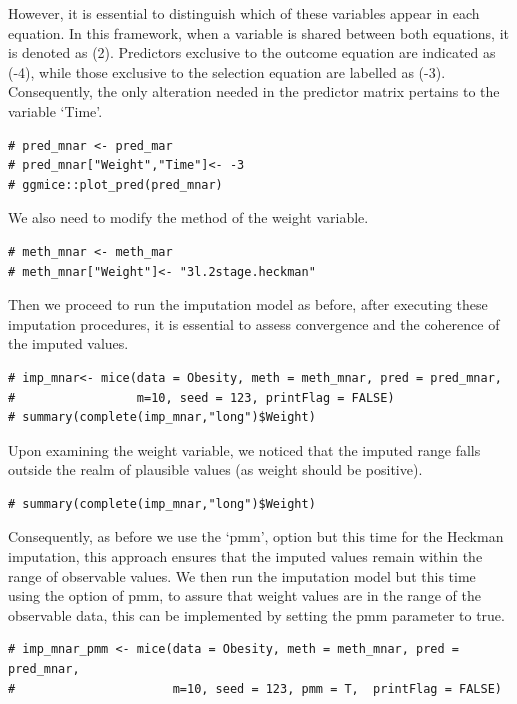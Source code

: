 \documentclass[
  article]{jss}
\begin{document}
However, it is essential to distinguish which of these variables appear
in each equation. In this framework, when a variable is shared between
both equations, it is denoted as (2). Predictors exclusive to the
outcome equation are indicated as (-4), while those exclusive to the
selection equation are labelled as (-3). Consequently, the only
alteration needed in the predictor matrix pertains to the variable
`Time'.

\begin{verbatim}
# pred_mnar <- pred_mar
# pred_mnar["Weight","Time"]<- -3
# ggmice::plot_pred(pred_mnar)
\end{verbatim}

We also need to modify the method of the weight variable.

\begin{verbatim}
# meth_mnar <- meth_mar
# meth_mnar["Weight"]<- "3l.2stage.heckman"
\end{verbatim}

Then we proceed to run the imputation model as before, after executing
these imputation procedures, it is essential to assess convergence and
the coherence of the imputed values.

\begin{verbatim}
# imp_mnar<- mice(data = Obesity, meth = meth_mnar, pred = pred_mnar,
#                 m=10, seed = 123, printFlag = FALSE)
# summary(complete(imp_mnar,"long")$Weight)
\end{verbatim}

Upon examining the weight variable, we noticed that the imputed range
falls outside the realm of plausible values (as weight should be
positive).

\begin{verbatim}
# summary(complete(imp_mnar,"long")$Weight)
\end{verbatim}

Consequently, as before we use the `pmm', option but this time for the
Heckman imputation, this approach ensures that the imputed values remain
within the range of observable values. We then run the imputation model
but this time using the option of pmm, to assure that weight values are
in the range of the observable data, this can be implemented by setting
the pmm parameter to true.

\begin{verbatim}
# imp_mnar_pmm <- mice(data = Obesity, meth = meth_mnar, pred = pred_mnar,
#                      m=10, seed = 123, pmm = T,  printFlag = FALSE)
\end{verbatim}
\end{document}
